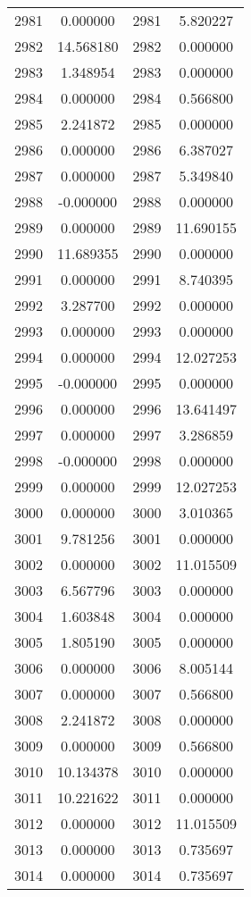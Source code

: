 \documentclass[12pt]{article}
\begin{document}
\begin{longtable}{@{}cccc@{}}
2981 & 0.000000 & 2981 & 5.820227 \\
2982 & 14.568180 & 2982 & 0.000000 \\
2983 & 1.348954 & 2983 & 0.000000 \\
2984 & 0.000000 & 2984 & 0.566800 \\
2985 & 2.241872 & 2985 & 0.000000 \\
2986 & 0.000000 & 2986 & 6.387027 \\
2987 & 0.000000 & 2987 & 5.349840 \\
2988 & -0.000000 & 2988 & 0.000000 \\
2989 & 0.000000 & 2989 & 11.690155 \\
2990 & 11.689355 & 2990 & 0.000000 \\
2991 & 0.000000 & 2991 & 8.740395 \\
2992 & 3.287700 & 2992 & 0.000000 \\
2993 & 0.000000 & 2993 & 0.000000 \\
2994 & 0.000000 & 2994 & 12.027253 \\
2995 & -0.000000 & 2995 & 0.000000 \\
2996 & 0.000000 & 2996 & 13.641497 \\
2997 & 0.000000 & 2997 & 3.286859 \\
2998 & -0.000000 & 2998 & 0.000000 \\
2999 & 0.000000 & 2999 & 12.027253 \\
3000 & 0.000000 & 3000 & 3.010365 \\
3001 & 9.781256 & 3001 & 0.000000 \\
3002 & 0.000000 & 3002 & 11.015509 \\
3003 & 6.567796 & 3003 & 0.000000 \\
3004 & 1.603848 & 3004 & 0.000000 \\
3005 & 1.805190 & 3005 & 0.000000 \\
3006 & 0.000000 & 3006 & 8.005144 \\
3007 & 0.000000 & 3007 & 0.566800 \\
3008 & 2.241872 & 3008 & 0.000000 \\
3009 & 0.000000 & 3009 & 0.566800 \\
3010 & 10.134378 & 3010 & 0.000000 \\
3011 & 10.221622 & 3011 & 0.000000 \\
3012 & 0.000000 & 3012 & 11.015509 \\
3013 & 0.000000 & 3013 & 0.735697 \\
3014 & 0.000000 & 3014 & 0.735697 \\

\end{longtable}
\end{document}
